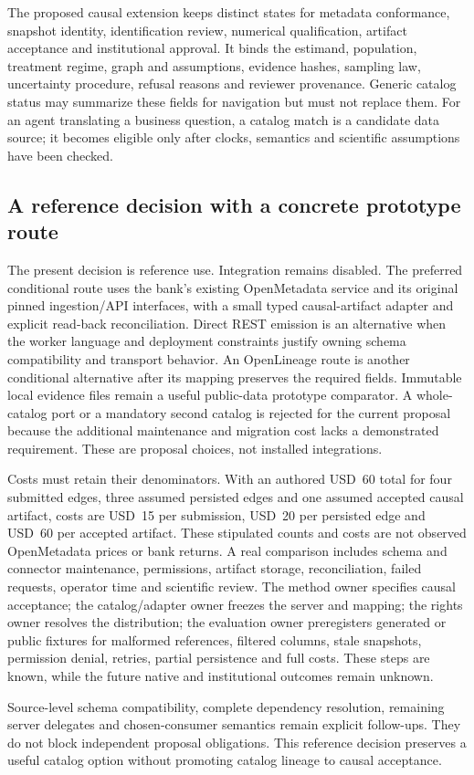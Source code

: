 The proposed causal extension keeps distinct states for metadata conformance,
snapshot identity, identification review, numerical qualification, artifact
acceptance and institutional approval. It binds the estimand, population,
treatment regime, graph and assumptions, evidence hashes, sampling law,
uncertainty procedure, refusal reasons and reviewer provenance. Generic catalog
status may summarize these fields for navigation but must not replace them.
For an agent translating a business question, a catalog match is a candidate
data source; it becomes eligible only after clocks, semantics and scientific
assumptions have been checked.

\subsection{A reference decision with a concrete prototype route}

The present decision is reference use. Integration remains disabled. The
preferred conditional route uses the bank's existing OpenMetadata service and
its original pinned ingestion/API interfaces, with a small typed causal-artifact
adapter and explicit read-back reconciliation. Direct REST emission is an
alternative when the worker language and deployment constraints justify owning
schema compatibility and transport behavior. An OpenLineage route is another
conditional alternative after its mapping preserves the required fields.
Immutable local evidence files remain a useful public-data prototype comparator.
A whole-catalog port or a mandatory second catalog is rejected for the current
proposal because the additional maintenance and migration cost lacks a
demonstrated requirement. These are proposal choices, not installed integrations.
\citep{exec24_openmetadata_source,exec24_openmetadata_reference}

Costs must retain their denominators. With an authored USD~60 total for four
submitted edges, three assumed persisted edges and one assumed accepted causal
artifact, costs are USD~15 per submission, USD~20 per persisted edge and USD~60
per accepted artifact. These stipulated counts and costs are not observed
OpenMetadata prices or bank returns. A real comparison includes schema and
connector maintenance, permissions, artifact storage, reconciliation, failed
requests, operator time and scientific review. The method owner specifies causal
acceptance; the catalog/adapter owner freezes the server and mapping; the rights
owner resolves the distribution; the evaluation owner preregisters generated
or public fixtures for malformed references, filtered columns, stale snapshots,
permission denial, retries, partial persistence and full costs. These steps are
known, while the future native and institutional outcomes remain unknown.
\citep{exec24_openmetadata_reference}

Source-level schema compatibility, complete dependency resolution, remaining
server delegates and chosen-consumer semantics remain explicit follow-ups.
They do not block independent proposal obligations. This reference decision
preserves a useful catalog option without promoting catalog lineage to causal
acceptance.
